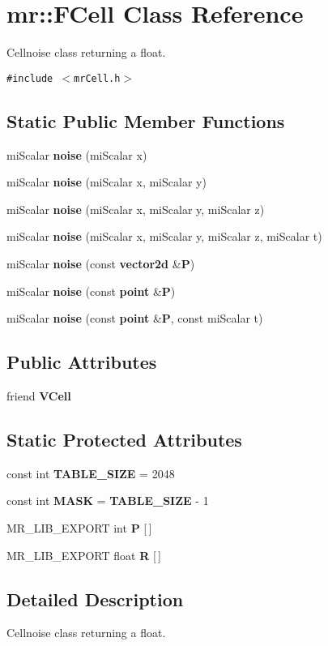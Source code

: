 \section{mr::FCell Class Reference}
\label{classmr_1_1FCell}
Cellnoise class returning a float.  


{\tt \#include $<$mr\-Cell.h$>$}

\subsection*{Static Public Member Functions}
\begin{CompactItemize}
\item 
mi\-Scalar {\bf noise} (mi\-Scalar x)
\item 
mi\-Scalar {\bf noise} (mi\-Scalar x, mi\-Scalar y)
\item 
mi\-Scalar {\bf noise} (mi\-Scalar x, mi\-Scalar y, mi\-Scalar z)
\item 
mi\-Scalar {\bf noise} (mi\-Scalar x, mi\-Scalar y, mi\-Scalar z, mi\-Scalar t)
\item 
mi\-Scalar {\bf noise} (const {\bf vector2d} \&{\bf P})
\item 
mi\-Scalar {\bf noise} (const {\bf point} \&{\bf P})
\item 
mi\-Scalar {\bf noise} (const {\bf point} \&{\bf P}, const mi\-Scalar t)
\end{CompactItemize}
\subsection*{Public Attributes}
\begin{CompactItemize}
\item 
friend {\bf VCell}
\end{CompactItemize}
\subsection*{Static Protected Attributes}
\begin{CompactItemize}
\item 
const int {\bf TABLE\_\-SIZE} = 2048
\item 
const int {\bf MASK} = {\bf TABLE\_\-SIZE} - 1
\item 
MR\_\-LIB\_\-EXPORT int {\bf P} [$\,$]
\item 
MR\_\-LIB\_\-EXPORT float {\bf R} [$\,$]
\end{CompactItemize}


\subsection{Detailed Description}
Cellnoise class returning a float. 



